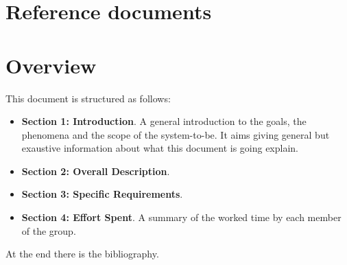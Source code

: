 \section{Reference documents}
\section{Overview}
This document is structured as follows:
\begin{itemize}
  \setlength{\itemindent}{-.4in}
  \item[] \textbf{Section 1: Introduction}. A general introduction to the goals, the phenomena and the scope of the system-to-be. It aims giving general but exaustive information about what this document is going explain.
  \item[] \textbf{Section 2: Overall Description}.
  \item[] \textbf{Section 3: Specific Requirements}.
  \item[] \textbf{Section 4: Effort Spent}. A summary of the worked time by each member of the group.
\end{itemize}
At the end there is the bibliography.
